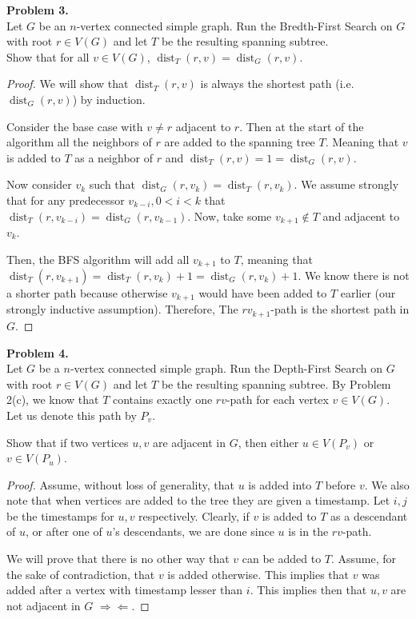 \documentclass{article}
\newcommand{\contradiction}{\Rightarrow\!\Leftarrow}
\DeclareMathOperator*{\dist}{dist}
\newenvironment{hwproof}[2]
{
    \textbf{Problem #1.}\\
    #2
    \begin{proof}
}{
    \end{proof}
}
\begin{document}
\begin{hwproof}{3}{
        Let $G$ be an $n$-vertex connected simple graph. Run the Bredth-First Search
        on $G$ with root $r \in V(G)$ and let $T$ be the resulting spanning subtree.\\
        Show that for all $v \in V(G)$, $\dist_T(r,v) = \dist_G(r,v)$.
    }
    We will show that $\dist_T(r,v)$ is always the shortest path (i.e. $\dist_G(r,v)$) by
    induction.

    Consider the base case with $v \neq r$ adjacent to $r$. Then at the start of the
    algorithm all the neighbors of $r$ are added to the spanning tree $T$. Meaning that
    $v$ is added to $T$ as a neighbor of $r$ and $\dist_T(r,v) = 1 = \dist_G(r,v)$.

    Now consider $v_k$ such that $\dist_G(r, v_k) = \dist_T(r,v_k)$. We assume strongly that
    for any predecessor $v_{k - i}, 0 < i < k$ that $\dist_T(r, v_{k - i}) = \dist_G(r, v_{k-1})$.
    Now, take some $v_{k + 1} \not \in T$ and adjacent to $v_k$.

    Then, the BFS algorithm will add all $v_{k + 1}$ to $T$, meaning
    that $\dist_T(r, v_{k + 1}) = \dist_T(r, v_k) + 1 = \dist_G(r, v_k) + 1$.
    We know there is not a shorter path because otherwise $v_{k + 1}$ would have been added to $T$
    earlier (our strongly inductive assumption). Therefore, The $rv_{k + 1}$-path is the shortest
    path in $G$.
\end{hwproof}

\begin{hwproof}{4}
    {
        Let $G$ be a $n$-vertex connected simple graph. Run the Depth-First Search
        on $G$ with root $r \in V(G)$ and let $T$ be the resulting spanning subtree.
        By Problem 2(c), we know that $T$ contains exactly one $rv$-path for each vertex
        $v \in V(G)$. Let us denote this path by $P_v$.

        Show that if two vertices $u, v$ are adjacent in $G$, then either $u \in V(P_v)$
        or $v \in V(P_u)$.
    }
    Assume, without loss of generality, that $u$ is added into $T$ before $v$. We also note that when
    vertices are added to the tree they are given a timestamp. Let $i,j$ be the timestamps for
    $u, v$ respectively. Clearly, if $v$ is added to $T$ as a descendant of $u$, or after
    one of $u$'s descendants, we are done since $u$ is in the $rv$-path.

    We will prove that there is no other way that $v$ can be added to $T$. Assume, for the sake
    of contradiction, that $v$ is added otherwise. This implies that $v$ was added after a vertex
    with timestamp lesser than $i$. This implies then that $u,v$ are not adjacent in $G$ $\contradiction$.
\end{hwproof}
\end{document}
